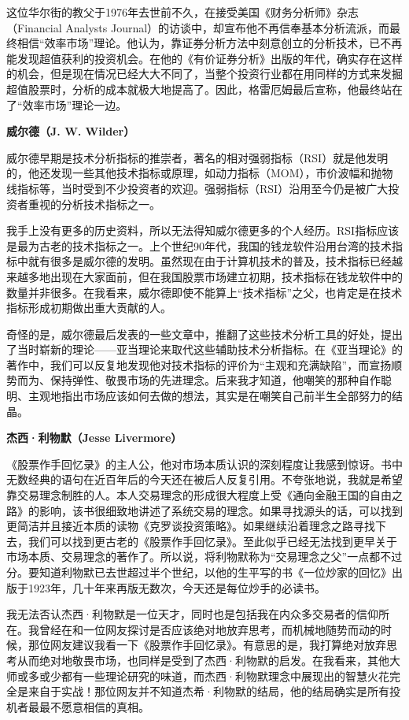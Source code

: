 这位华尔街的教父于1976年去世前不久，在接受美国《财务分析师》杂志（Financial Analysts Journal）的访谈中，却宣布他不再信奉基本分析流派，而最终相信“效率市场”理论。他认为，靠证券分析方法中刻意创立的分析技术，已不再能发现超值获利的投资机会。在他的《有价证券分析》出版的年代，确实存在这样的机会，但是现在情况已经大大不同了，当整个投资行业都在用同样的方式来发掘超值股票时，分析的成本就极大地提高了。因此，格雷厄姆最后宣称，他最终站在了“效率市场”理论一边。

\textbf{威尔德（J. W. Wilder）}

威尔德早期是技术分析指标的推崇者，著名的相对强弱指标（RSI）就是他发明的，他还发现一些其他技术指标或原理，如动力指标（MOM），市价波幅和抛物线指标等，当时受到不少投资者的欢迎。强弱指标（RSI）沿用至今仍是被广大投资者重视的分析技术指标之一。

我手上没有更多的历史资料，所以无法得知威尔德更多的个人经历。RSI指标应该是最为古老的技术指标之一。上个世纪90年代，我国的钱龙软件沿用台湾的技术指标中就有很多是威尔德的发明。虽然现在由于计算机技术的普及，技术指标已经越来越多地出现在大家面前，但在我国股票市场建立初期，技术指标在钱龙软件中的数量并非很多。在我看来，威尔德即使不能算上“技术指标”之父，也肯定是在技术指标形成初期做出重大贡献的人。

奇怪的是，威尔德最后发表的一些文章中，推翻了这些技术分析工具的好处，提出了当时崭新的理论——亚当理论来取代这些辅助技术分析指标。在《亚当理论》的著作中，我们可以反复地发现他对技术指标的评价为“主观和充满缺陷”，而宣扬顺势而为、保持弹性、敬畏市场的先进理念。后来我才知道，他嘲笑的那种自作聪明、主观地指出市场应该如何去做的想法，其实是在嘲笑自己前半生全部努力的结晶。

\textbf{杰西·利物默（Jesse Livermore）}

《股票作手回忆录》的主人公，他对市场本质认识的深刻程度让我感到惊讶。书中无数经典的语句在近百年后的今天还在被后人反复引用。不夸张地说，我就是希望靠交易理念制胜的人。本人交易理念的形成很大程度上受《通向金融王国的自由之路》的影响，该书很细致地讲述了系统交易的理念。如果寻找源头的话，可以找到更简洁并且接近本质的读物《克罗谈投资策略》。如果继续沿着理念之路寻找下去，我们可以找到更古老的《股票作手回忆录》。至此似乎已经无法找到更早关于市场本质、交易理念的著作了。所以说，将利物默称为“交易理念之父”一点都不过分。要知道利物默已去世超过半个世纪，以他的生平写的书《一位炒家的回忆》出版于1923年，几十年来再版无数次，今天还是每位炒手的必读书。

我无法否认杰西·利物默是一位天才，同时也是包括我在内众多交易者的信仰所在。我曾经在和一位网友探讨是否应该绝对地放弃思考，而机械地随势而动的时候，那位网友建议我看一下《股票作手回忆录》。有意思的是，我打算绝对放弃思考从而绝对地敬畏市场，也同样是受到了杰西·利物默的启发。在我看来，其他大师或多或少都有一些理论研究的味道，而杰西·利物默理念中展现出的智慧火花完全是来自于实战！那位网友并不知道杰希·利物默的结局，他的结局确实是所有投机者最最不愿意相信的真相。

